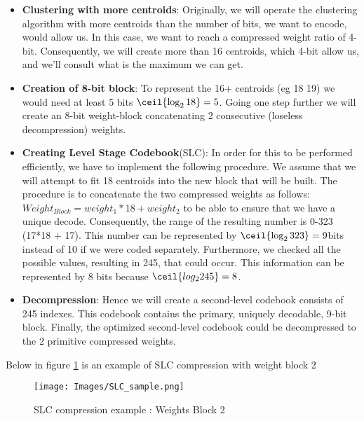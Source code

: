 \begin{itemize}
    \item \textbf{Clustering with more centroids}:
    Originally, we will operate the clustering algorithm with more centroids than the number of bits, we want to encode, would allow us. In this case, we want to reach a compressed weight ratio of 4-bit. Consequently, we will create more than 16 centroids, which  4-bit allow us, and we'll consult what is the maximum we can get.
    
    \item \textbf{Creation of 8-bit block}: To represent the 16+ centroids (eg 18 19) we would need at least 5 bits $\ceil{\log_2 18}=5$. Going one step further we will create an 8-bit weight-block concatenating 2 consecutive (loseless decompression) weights.
    
    \item \textbf{Creating Level Stage Codebook}(SLC): In order for this to be performed efficiently, we have to implement the following procedure. We assume that we will attempt to fit 18 centroids into the new block that will be built. The procedure is to concatenate the two compressed weights as follows: $Weight_{Block}=weight_{1}*18 + weight_{2}$ to be able to ensure that we have a unique decode. Consequently, the range of the resulting number is 0-323 (17*18 + 17). This number can be represented by $\ceil{\log_2 323} = 9 $bits instead of 10 if we were coded separately. Furthermore, we checked all the possible values, resulting in 245, that could occur. This information can be represented by 8 bits because $\ceil{log_2 245} = 8$. 
    
    \item \textbf{Decompression}: 
    Hence we will create a second-level codebook consists of 245 indexes. This codebook contains the primary, uniquely decodable, 9-bit block. Finally, the optimized second-level codebook could be decompressed to the 2 primitive compressed weights.
    
 \end{itemize}
  
  Below in figure \ref{fig:slc_sample} is an example of SLC compression with weight block 2
  
\begin{figure}[h]
\centering
\texttt{[image: Images/SLC\_sample.png]} 
\decoRule
\caption[SLC compression example]{SLC compression example : Weights Block 2
}
\label{fig:slc_sample}
\end{figure}


